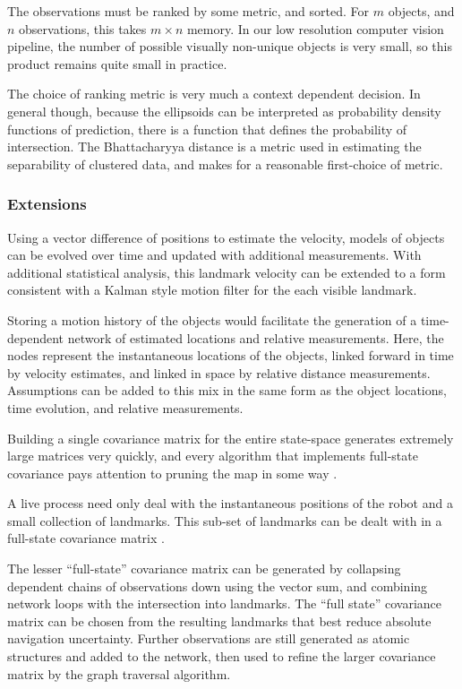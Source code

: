 \documentclass[a4paper, 11pt, titlepage]{article}
\begin{document}
      The observations must be ranked by some metric, and sorted.  For \(m\) objects, and \(n\) observations, this takes \(m \times n\) memory.  In our low resolution computer vision pipeline, the number of possible visually non-unique objects is very small, so this product remains quite small in practice.

      The choice of ranking metric is very much a context dependent decision.  In general though, because the ellipsoids can be interpreted as probability density functions of prediction, there is a function that defines the probability of intersection. The Bhattacharyya distance is a metric used in estimating the separability of clustered data, and makes for a reasonable first-choice of metric.

    \subsubsection{Extensions}


      Using a vector difference of positions to estimate the velocity, models of objects can be evolved over time and updated with additional measurements.  With additional statistical analysis, this landmark velocity can be extended to a form consistent with a Kalman style motion filter for the each visible landmark.

      Storing a motion history of the objects would facilitate the generation of a time-dependent network of estimated locations and relative measurements.
      Here, the nodes represent the instantaneous locations of the objects, linked forward in time by velocity estimates, and linked in space by relative distance measurements.  Assumptions can be added to this mix in the same form as the object locations, time evolution, and relative measurements.



      Building a single covariance matrix for the entire state-space generates extremely large matrices very quickly, and every algorithm that implements full-state covariance pays attention to pruning the map in some way\cite{monoslam} \cite{airshipSLAM}.
      
      A live process need only deal with the instantaneous positions of the robot and a small collection of landmarks. This sub-set of landmarks can be dealt with in a full-state covariance matrix \cite{monoslam}.  
      
      The lesser ``full-state'' covariance matrix can be generated by collapsing dependent chains of observations down using the vector sum, and combining network loops with the intersection into landmarks.  The ``full state'' covariance matrix can be chosen from the resulting landmarks that best reduce absolute navigation uncertainty.  Further observations are still generated as atomic structures and added to the network, then used to refine the larger covariance matrix by the graph traversal algorithm.  
\end{document}
